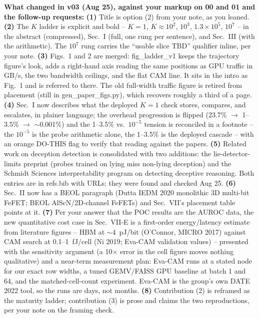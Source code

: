\documentclass[conference]{IEEEtran}
\newcommand{\cam}{{CAM}\xspace}
\newcommand{\fefet}{{FeFET}\xspace}
\newcommand{\auroc}{{AUROC}\xspace}
\begin{document}
{\begin{pnote}[aiviolet]
\textbf{What changed in v03 (Aug 25), against your markup on 00 and 01
and the follow-up requests:}
{\bf (1)} Title is option (2) from your note, as you leaned.
{\bf (2)} The $K$ ladder is explicit and bold -- $K=1$,
$K\!\approx\!10^{2}$, $10^{3}$, $1.3\!\times\!10^{5}$, $10^{7}$ -- in
the abstract (compressed), Sec.~I (full, one rung per sentence), and
Sec.~III (with the arithmetic). The $10^{7}$ rung carries the
``usable slice TBD'' qualifier inline, per your note.
{\bf (3)} Figs.~1 and 2 are merged: fig\_ladder\_v1 keeps the
trajectory figure's look, adds a right-hand axis reading the same
positions as GPU traffic in GB/s, the two bandwidth ceilings, and the
flat \cam line. It sits in the intro as Fig.~1 and is referred to
there. The old full-width traffic figure is retired from placement
(still in gen\_paper\_figs.py), which recovers roughly a third of a
page.
{\bf (4)} Sec.~I now describes what the deployed $K=1$ check stores,
compares, and escalates, in plainer language; the overhead progression
is flipped (23.7\% $\to$ 1--3.5\% $\to$ $\sim$0.001\%) and the
1--3.5\% vs.\ $10^{-5}$ tension is reconciled in a footnote -- the
$10^{-5}$ is the probe arithmetic alone, the 1--3.5\% is the deployed
cascade -- with an orange DO-THIS flag to verify that reading against
the papers.
{\bf (5)} Related work on deception detection is consolidated with two
additions: the lie-detector-limits preprint (probes trained on lying
miss non-lying deception) and the Schmidt Sciences interpretability
program on detecting deceptive reasoning. Both entries are in
refs.bib with URLs; they were found and checked Aug 25.
{\bf (6)} Sec.~II now has a BEOL paragraph (Dutta IEDM 2020 monolithic
3D multi-bit \fefet; BEOL AlScN/2D-channel FeFETs) and Sec.~VII's
placement table points at it.
{\bf (7)} Per your answer that the POC results are the \auroc data,
the new quantitative cost case in Sec.~VII-E is a first-order
energy/latency estimate from literature figures -- HBM at
$\sim$4~pJ/bit (O'Connor, MICRO 2017) against \cam search at
0.1--1~fJ/cell (Ni 2019; Eva-CAM validation values) -- presented with
the sensitivity argument (a 10$\times$ error in the cell figure moves
nothing qualitative) and a near-term measurement plan: Eva-CAM runs at
a stated node for our exact row widths, a tuned GEMV/FAISS GPU
baseline at batch 1 and 64, and the matched-cell-count experiment.
Eva-CAM is the group's own DATE 2022 tool, so the runs are days, not
months.
{\bf (8)} Contribution (2) is reframed as the maturity ladder;
contribution (3) is prose and claims the two reproductions, per your
note on the framing check.


\end{pnote}}
\end{document}
